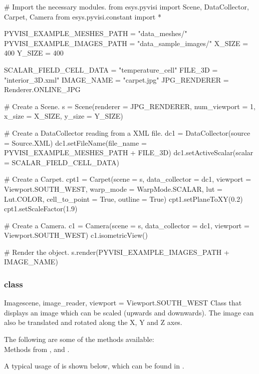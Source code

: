 \begin{python}
# Import the necessary modules.
from esys.pyvisi import Scene, DataCollector, Carpet, Camera
from esys.pyvisi.constant import *

PYVISI_EXAMPLE_MESHES_PATH = "data_meshes/"
PYVISI_EXAMPLE_IMAGES_PATH = "data_sample_images/"
X_SIZE = 400
Y_SIZE = 400

SCALAR_FIELD_CELL_DATA = "temperature_cell"
FILE_3D = "interior_3D.xml"
IMAGE_NAME = "carpet.jpg"
JPG_RENDERER = Renderer.ONLINE_JPG

# Create a Scene.
s = Scene(renderer = JPG_RENDERER, num_viewport = 1, x_size = X_SIZE, 
        y_size = Y_SIZE)

# Create a DataCollector reading from a XML file.
dc1 = DataCollector(source = Source.XML)
dc1.setFileName(file_name = PYVISI_EXAMPLE_MESHES_PATH + FILE_3D)
dc1.setActiveScalar(scalar = SCALAR_FIELD_CELL_DATA)

# Create a Carpet.
cpt1 = Carpet(scene = s, data_collector = dc1, viewport = Viewport.SOUTH_WEST, 
        warp_mode = WarpMode.SCALAR, lut = Lut.COLOR, cell_to_point = True,
        outline = True)
cpt1.setPlaneToXY(0.2)
cpt1.setScaleFactor(1.9)

# Create a Camera.
c1 = Camera(scene = s, data_collector = dc1, viewport = Viewport.SOUTH_WEST)
c1.isometricView()

# Render the object.
s.render(PYVISI_EXAMPLE_IMAGES_PATH + IMAGE_NAME)
\end{python}

\subsubsection{\Image class}

\begin{classdesc}{Image}{scene, image_reader, viewport = Viewport.SOUTH_WEST}
Class that displays an image which can be scaled (upwards and downwards). The 
image can also be translated and rotated along the X, Y and Z axes.
\end{classdesc}

The following are some of the methods available:\\
Methods from \ActorThreeD, \PlaneSource and \Transform.

A typical usage of \Image is shown below, which can be found in 
\texttt{\PyvisiExampleDirectory}.

